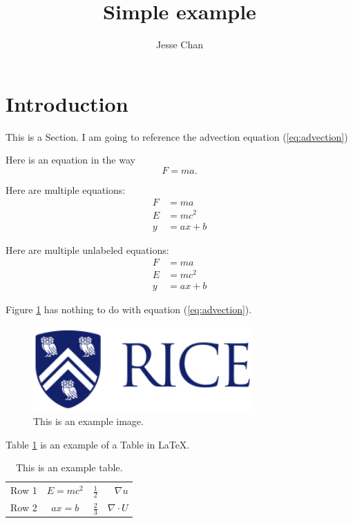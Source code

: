 \documentclass{article}
\title{Simple example}
\author{Jesse Chan}
\date{}
\begin{document}
\maketitle

\section{Introduction}

This is a Section. I am going to reference the advection equation (\ref{eq:advection})

Here is an equation in the way
\begin{equation}
F = ma.
\end{equation}

Here are multiple equations:
\begin{align}
  F &= ma\\
  E &= mc^2\\
  y &= ax + b
\end{align}

Here are multiple unlabeled equations:
\begin{align*}
  F &= ma\\
  E &= mc^2\\
  y &= ax + b
\end{align*}

Figure \ref{fig:example_fig} has nothing to do with equation (\ref{eq:advection}).
\begin{figure}[!h]
\centering
\includegraphics[width=0.75\textwidth]{image.png}
\caption{This is an example image.}
\label{fig:example_fig}
\end{figure}

Table \ref{tab:example_table} is an example of a Table in \LaTeX.
\begin{table}[!h]
  \centering
  \begin{tabular}{|l|c|c|r|}
    \hline
    Row 1 & $E=mc^2$ & $\frac{1}{2}$ & $\nabla u$\\
    Row 2 & $ax = b$ & $\frac{2}{3}$ & $\nabla\cdot U$\\
    \hline
  \end{tabular}
  \caption{This is an example table.}
  \label{tab:example_table}
\end{table}
\end{document}
